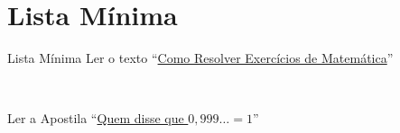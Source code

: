 \documentclass[fleqn,aspectratio=169,12pt]{beamer}
\begin{document}
\section{Lista Mínima}

\begin{frame}{Lista Mínima}
  Ler o texto
  ``\href{https://drive.google.com/file/d/1iUuy68VWqKabrV7JxTwlyOgr59cA9G2r/view?usp=sharing}%
  {Como Resolver Exercícios de Matemática}''

  ~

  Ler a Apostila
  ``\href{https://material-didatico.github.io/pages/infinito/}%
  {Quem disse que $0,999\dots=1$}''
\end{frame}

\end{document}
